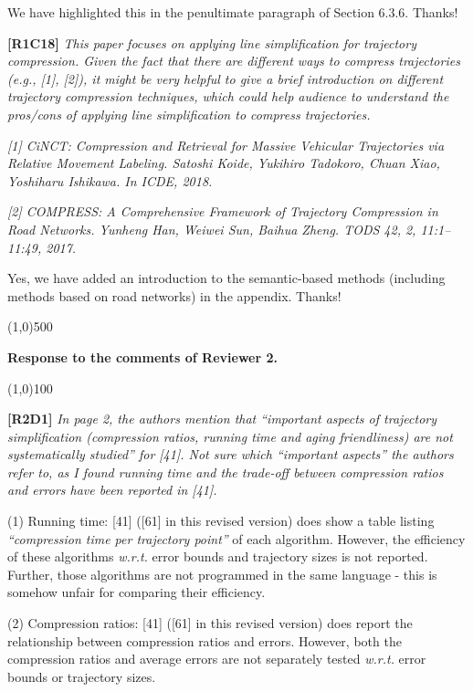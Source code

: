 \documentclass{letter}
\newcommand{\wrt}{\emph{w.r.t.}\xspace}
\begin{document}
We have highlighted this in the penultimate paragraph of Section 6.3.6.
Thanks!

\textbf{[R1C18]} \emph{ This paper focuses on applying line simplification for trajectory compression. Given the fact that there are different ways to compress trajectories (e.g., [1], [2]), it might be very helpful to give a brief introduction on different trajectory compression techniques, which could help audience to understand the pros/cons of applying line simplification to compress trajectories. }

\emph{ [1] CiNCT: Compression and Retrieval for Massive Vehicular Trajectories via Relative Movement Labeling. Satoshi Koide, Yukihiro Tadokoro, Chuan Xiao, Yoshiharu Ishikawa. In ICDE, 2018.}

\emph{ [2] COMPRESS: A Comprehensive Framework of Trajectory Compression in Road Networks. Yunheng Han, Weiwei Sun, Baihua Zheng. TODS 42, 2, 11:1--11:49, 2017.}


{Yes, we have added an introduction to the semantic-based methods (including methods based on road networks) in the appendix. Thanks!}

\line(1,0){500}

\textbf{Response to the comments of Reviewer 2.}

\line(1,0){100}

\textbf{[R2D1]} \emph{In page 2, the authors mention that ``important aspects of trajectory simplification (compression ratios, running time and aging friendliness) are not systematically studied'' for [41]. Not sure which ``important aspects'' the authors refer to, as I found running time and the trade-off between compression ratios and errors have been reported in [41].}

(1) Running time: [41] ([61] in this revised version) does show a table listing \emph{``compression time per trajectory point''} of each algorithm.  However, the efficiency of these algorithms \wrt error bounds and trajectory sizes is not reported. Further, those algorithms are not programmed in the same language - this is somehow unfair for comparing their efficiency.

(2) Compression ratios: [41] ([61] in this revised version)  does report the relationship between compression ratios and errors. However, both the compression ratios and average errors are not separately tested \wrt error bounds or trajectory sizes.
\end{document}
